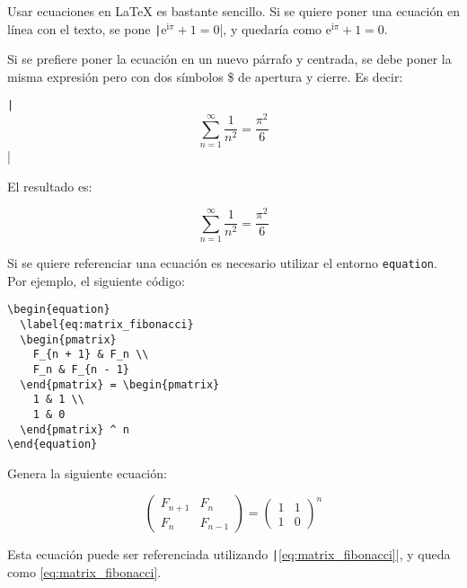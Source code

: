 \documentclass[../../main.tex]{subfile}
\begin{document}
  Usar ecuaciones en LaTeX es bastante sencillo. Si se quiere poner una ecuación en línea con el texto, se pone \texttt|$\mathrm{e}^{\mathrm{i}\pi} + 1 = 0$|, y quedaría como $\mathrm{e}^{\mathrm{i}\pi} + 1 = 0$.

  Si se prefiere poner la ecuación en un nuevo párrafo y centrada, se debe poner la misma expresión pero con dos símbolos \$ de apertura y cierre. Es decir: 
  
  \texttt|$$\sum_{n = 1}^\infty \frac{1}{n^2} = \frac{\pi^2}{6}$$|
  
  El resultado es:

  $$
  \sum_{n = 1}^\infty \frac{1}{n^2} = \frac{\pi^2}{6}
  $$

  Si se quiere referenciar una ecuación es necesario utilizar el entorno \texttt{equation}. Por ejemplo, el siguiente código:

  \begin{verbatim}
\begin{equation}
  \label{eq:matrix_fibonacci}
  \begin{pmatrix}
    F_{n + 1} & F_n \\
    F_n & F_{n - 1}
  \end{pmatrix} = \begin{pmatrix}
    1 & 1 \\
    1 & 0
  \end{pmatrix} ^ n
\end{equation}
  \end{verbatim}

  Genera la siguiente ecuación:

  \begin{equation}
    \label{eq:matrix_fibonacci}
    \begin{pmatrix}
      F_{n + 1} & F_n \\
      F_n & F_{n - 1}
    \end{pmatrix} = \begin{pmatrix}
      1 & 1 \\
      1 & 0
    \end{pmatrix} ^ n
  \end{equation}

  Esta ecuación puede ser referenciada utilizando \texttt|\eqref{eq:matrix_fibonacci}|, y queda como \eqref{eq:matrix_fibonacci}.
\end{document}
